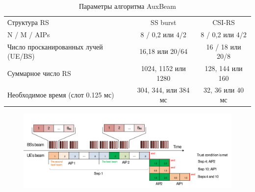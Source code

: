 \begin{table}
    \centering
    \caption{Параметры алгоритма AuxBeam}
    \begin{tabular}{lcc}
        \toprule
        \midrule
        Структура RS                         & SS burst             & CSI-RS            \\
        N / M / AIPs                         & 8 / 0,2  или 4/2     & 8 / 0,2 или 4/2   \\
        Число просканированных лучей (UE/BS) & 16,18 или 20/64      & 16 / 18  или 20/8 \\
        Суммарное число RS                   & 1024, 1152 или 1280  & 128, 144 или 160  \\
        Необходимое время (слот 0.125 мс)    & 304, 344, или 384 мс & 32, 36 или 40 мс  \\
        \hline
    \end{tabular}
\end{table}
\begin{figure}[h!]
    \centering
    \includegraphics[width=\linewidth]{figs/fig4.26}
    \caption{}
    \label{fig:4.26}
\end{figure}


